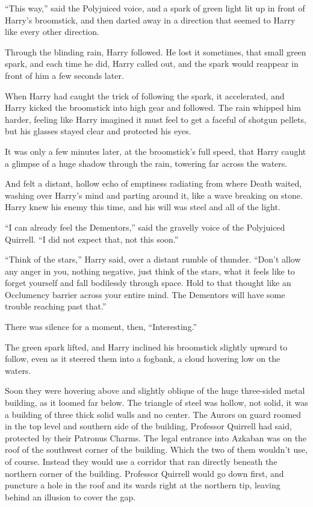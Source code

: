 ``This way,'' said the Polyjuiced voice, and a spark of green light lit
up in front of Harry's broomstick, and then darted away in a direction
that seemed to Harry like every other direction.

Through the blinding rain, Harry followed. He lost it sometimes, that
small green spark, and each time he did, Harry called out, and the spark
would reappear in front of him a few seconds later.

When Harry had caught the trick of following the spark, it accelerated,
and Harry kicked the broomstick into high gear and followed. The rain
whipped him harder, feeling like Harry imagined it must feel to get a
faceful of shotgun pellets, but his glasses stayed clear and protected
his eyes.

It was only a few minutes later, at the broomstick's full speed, that
Harry caught a glimpse of a huge shadow through the rain, towering far
across the waters.

And felt a distant, hollow echo of emptiness radiating from where Death
waited, washing over Harry's mind and parting around it, like a wave
breaking on stone. Harry knew his enemy this time, and his will was
steel and all of the light.

``I can already feel the Dementors,'' said the gravelly voice of the
Polyjuiced Quirrell. ``I did not expect that, not this soon.''

``Think of the stars,'' Harry said, over a distant rumble of thunder.
``Don't allow any anger in you, nothing negative, just think of the
stars, what it feels like to forget yourself and fall bodilessly through
space. Hold to that thought like an Occlumency barrier across your
entire mind. The Dementors will have some trouble reaching past that.''

There was silence for a moment, then, ``Interesting.''

The green spark lifted, and Harry inclined his broomstick slightly
upward to follow, even as it steered them into a fogbank, a cloud
hovering low on the waters.

Soon they were hovering above and slightly oblique of the huge
three-sided metal building, as it loomed far below. The triangle of
steel was hollow, not solid, it was a building of three thick solid
walls and no center. The Aurors on guard roomed in the top level and
southern side of the building, Professor Quirrell had said, protected by
their Patronus Charms. The legal entrance into Azkaban was on the roof
of the southwest corner of the building. Which the two of them wouldn't
use, of course. Instead they would use a corridor that ran directly
beneath the northern corner of the building. Professor Quirrell would go
down first, and puncture a hole in the roof and its wards right at the
northern tip, leaving behind an illusion to cover the gap.

